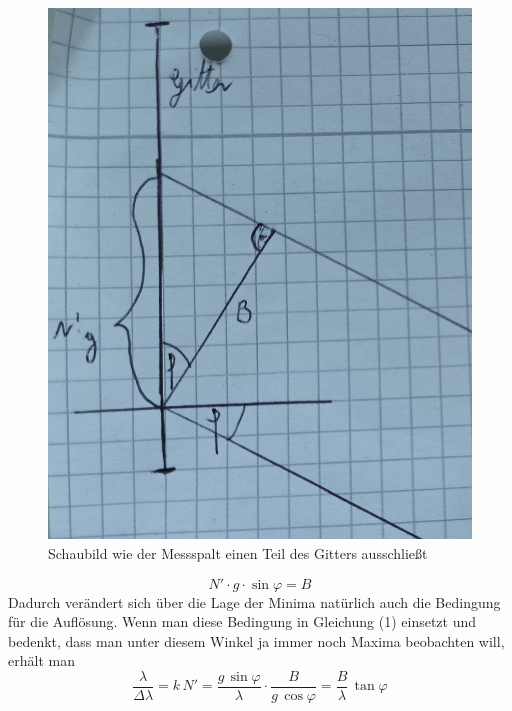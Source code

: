 \documentclass[a4paper, 12pt]{scrartcl}
\begin{document}
\begin{figure}[H]\centering\includegraphics[scale=0.18]{Gitter1}\caption{Schaubild wie der Messspalt einen Teil des Gitters ausschließt}\end{figure}
\begin{equation*}N'\cdot{g}\cdot\sin\varphi=B\end{equation*}
Dadurch verändert sich über die Lage der Minima natürlich auch die Bedingung für die Auflösung. Wenn man diese Bedingung in Gleichung (1) einsetzt und bedenkt, dass man unter diesem Winkel ja immer noch Maxima beobachten will, erhält man
\begin{equation}\frac{\lambda}{\Delta\lambda}=k\,N'=\frac{g\,\sin\varphi}{\lambda}\cdot\frac{B}{g\,\cos\varphi}=\frac{B}{\lambda}\,\tan\varphi\end{equation}
\end{document}
